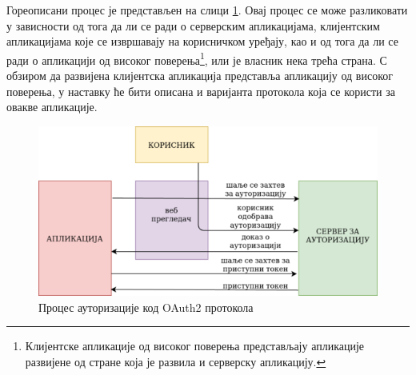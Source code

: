\documentclass[12pt,oneside]{memoir}
\begin{document}
Гореописани процес је представљен на слици \ref{fig:oauth2}. Овај процес се може разликовати у зависности од тога да ли се ради о серверским апликацијама, клијентским апликацијама које се извршавају на корисничком уређају, као и од тога да ли се ради о апликацији од високог поверења\footnote{Клијентске апликације од високог поверења представљају апликације развијене од стране која је развила и серверску апликацију.}, или је власник нека трећа страна. С обзиром да развијена клијентска апликација представља апликацију од високог поверења, у наставку ће бити описана и варијанта протокола која се користи за овакве апликације.

\begin{figure}[!ht]
  \centering
  \includegraphics[scale=0.7]{slike/oauth2.png}
  \caption{Процес ауторизације код OAuth2 протокола}
  \label{fig:oauth2}
\end{figure}
\end{document}
